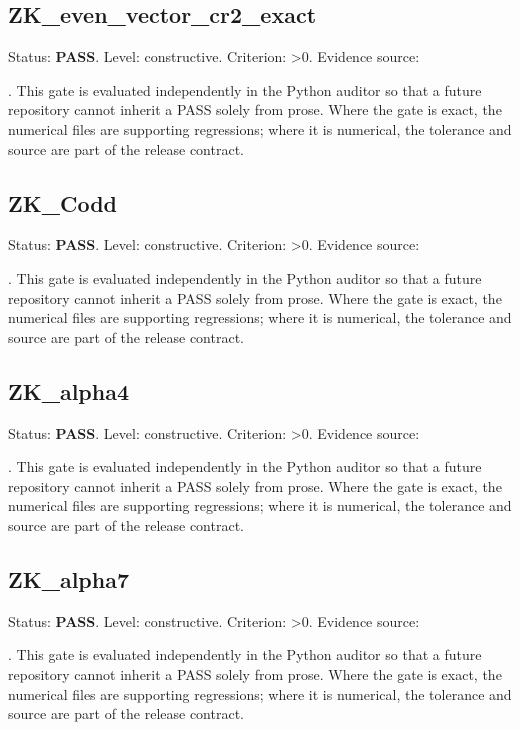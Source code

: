 \documentclass[11pt,a4paper,oneside]{book}
\begin{document}
\subsection{ZK\_even\_vector\_cr2\_exact}
Status: \textbf{PASS}. Level: constructive. Criterion: >0. Evidence source:\par\noindent{}. This gate is evaluated independently in the Python auditor so that a future repository cannot inherit a PASS solely from prose. Where the gate is exact, the numerical files are supporting regressions; where it is numerical, the tolerance and source are part of the release contract.\par

\subsection{ZK\_Codd}
Status: \textbf{PASS}. Level: constructive. Criterion: >0. Evidence source:\par\noindent{}. This gate is evaluated independently in the Python auditor so that a future repository cannot inherit a PASS solely from prose. Where the gate is exact, the numerical files are supporting regressions; where it is numerical, the tolerance and source are part of the release contract.\par

\subsection{ZK\_alpha4}
Status: \textbf{PASS}. Level: constructive. Criterion: >0. Evidence source:\par\noindent{}. This gate is evaluated independently in the Python auditor so that a future repository cannot inherit a PASS solely from prose. Where the gate is exact, the numerical files are supporting regressions; where it is numerical, the tolerance and source are part of the release contract.\par

\subsection{ZK\_alpha7}
Status: \textbf{PASS}. Level: constructive. Criterion: >0. Evidence source:\par\noindent{}. This gate is evaluated independently in the Python auditor so that a future repository cannot inherit a PASS solely from prose. Where the gate is exact, the numerical files are supporting regressions; where it is numerical, the tolerance and source are part of the release contract.\par
\end{document}
